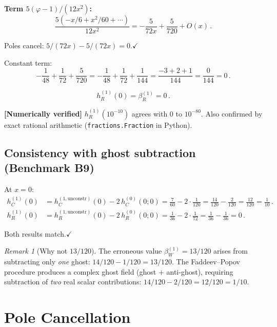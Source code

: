 \documentclass[11pt,a4paper]{article}
\theoremstyle{definition}
\theoremstyle{remark}
\newtheorem{remark}[theorem]{Remark}
\newcommand{\verified}[1]{%
  \par\noindent\colorbox{green!10}{%
    \parbox{\dimexpr\linewidth-2\fboxsep}{%
      \textcolor{green!50!black}{\textbf{[Numerically verified]}}
      \textcolor{green!50!black}{#1}%
    }%
  }\par%
}
\begin{document}
\textbf{Term $5(\varphi-1)/(12x^2)$:}
\begin{equation*}
  \frac{5(-x/6 + x^2/60 + \cdots)}{12x^2}
  = -\frac{5}{72x} + \frac{5}{720} + O(x)\,.
\end{equation*}

Poles cancel: $5/(72x) - 5/(72x) = 0$.\quad$\checkmark$

Constant term:
\begin{equation*}
  -\frac{1}{48} + \frac{1}{72} + \frac{5}{720}
  = -\frac{1}{48} + \frac{1}{72} + \frac{1}{144}
  = \frac{-3 + 2 + 1}{144} = \frac{0}{144} = 0\,.
\end{equation*}

\begin{equation}
  \boxed{h_R^{(1)}(0) = \beta_R^{(1)} = 0\,.}
  \label{eq:B2}
\end{equation}

\verified{$h_R^{(1)}(10^{-10})$ agrees with $0$ to $10^{-80}$.
Also confirmed by exact rational arithmetic
(\texttt{fractions.Fraction} in Python).}


\subsection{Consistency with ghost subtraction (Benchmark B9)}

At $x = 0$:
\begin{align*}
  h_C^{(1)}(0) &= h_C^{(1,\mathrm{unconstr})}(0) - 2\,h_C^{(0)}(0;0)
  = \frac{7}{60} - 2\cdot\frac{1}{120}
  = \frac{14}{120} - \frac{2}{120} = \frac{12}{120} = \frac{1}{10}\,.\\
  h_R^{(1)}(0) &= h_R^{(1,\mathrm{unconstr})}(0) - 2\,h_R^{(0)}(0;0)
  = \frac{1}{36} - 2\cdot\frac{1}{72}
  = \frac{1}{36} - \frac{1}{36} = 0\,.
\end{align*}

Both results match.\quad$\checkmark$

\begin{remark}[Why not $13/120$]
The erroneous value $\beta_W^{(1)} = 13/120$ arises from subtracting
only \emph{one} ghost: $14/120 - 1/120 = 13/120$.
The Faddeev--Popov procedure produces a complex ghost field
(ghost + anti-ghost), requiring subtraction of \emph{two}
real scalar contributions: $14/120 - 2/120 = 12/120 = 1/10$.
\end{remark}


\section{Pole Cancellation}
\label{sec:poles}
\end{document}

